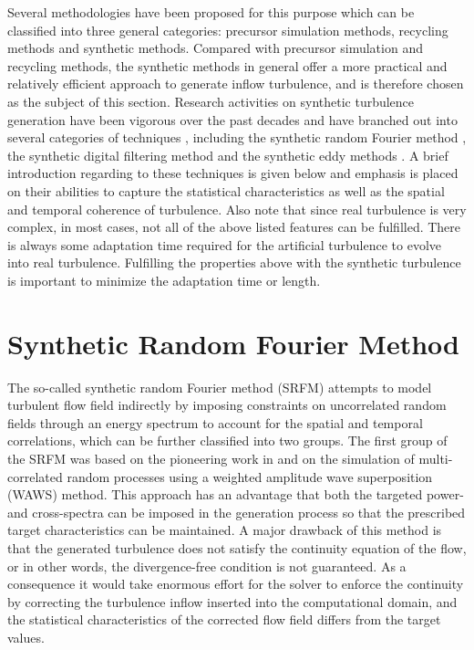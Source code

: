 \noindent Several methodologies have been proposed for this purpose which can be classified into three general categories: precursor simulation methods, recycling methods and synthetic methods. Compared with precursor simulation and recycling methods, the synthetic methods in general offer a more practical and relatively efficient approach to generate inflow turbulence, and is therefore chosen as the subject of this section. Research activities on synthetic turbulence generation have been vigorous over the past decades and have branched out into several categories of techniques \citep{wu2017}, including the synthetic random Fourier method \citep{kraichnan1970, hoshiya1972}, the synthetic digital filtering method \citep{klein2003} and the synthetic eddy methods \citep{jarrin2006}. A brief introduction regarding to these techniques is given below and emphasis is placed on their abilities to capture the statistical characteristics as well as the spatial and temporal coherence of turbulence. Also note that since real turbulence is very complex, in most cases, not all of the above listed features can be fulfilled. There is always some adaptation time required for the artificial turbulence to evolve into real turbulence. Fulfilling the properties above with the synthetic turbulence is important to minimize the adaptation time or length.

\section{Synthetic Random Fourier Method}

The so-called synthetic random Fourier method (SRFM) attempts to model turbulent flow field indirectly by imposing constraints on uncorrelated random fields through an energy spectrum to account for the spatial and temporal correlations, which can be further classified into two groups. 
The first group of the SRFM was based on the pioneering work in \cite{hoshiya1972} and \cite{shinozuka1972} on the simulation of multi-correlated random processes using a weighted amplitude wave superposition (WAWS) method. This approach has an advantage that both the targeted power- and cross-spectra can be imposed in the generation process so that the prescribed target characteristics can be maintained. A major drawback of this method is that the generated turbulence does not satisfy the continuity equation of the flow, or in other words, the divergence-free condition is not guaranteed. As a consequence it would take enormous effort for the solver to enforce the continuity by correcting the turbulence inflow inserted into the computational domain, and the statistical characteristics of the corrected flow field differs from the target values.

